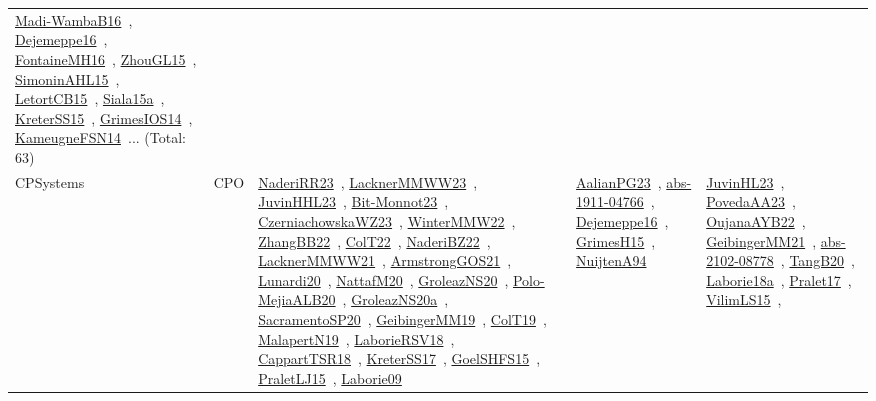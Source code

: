 {\begin{longtable}{lp{3cm}>{\raggedright\arraybackslash}p{6cm}>{\raggedright\arraybackslash}p{6cm}>{\raggedright\arraybackslash}p{8cm}}
\href{works/Madi-WambaB16.pdf}{Madi-WambaB16}~\cite{Madi-WambaB16}, \href{works/Dejemeppe16.pdf}{Dejemeppe16}~\cite{Dejemeppe16}, \href{works/FontaineMH16.pdf}{FontaineMH16}~\cite{FontaineMH16}, \href{works/ZhouGL15.pdf}{ZhouGL15}~\cite{ZhouGL15}, \href{works/SimoninAHL15.pdf}{SimoninAHL15}~\cite{SimoninAHL15}, \href{works/LetortCB15.pdf}{LetortCB15}~\cite{LetortCB15}, \href{works/Siala15a.pdf}{Siala15a}~\cite{Siala15a}, \href{works/KreterSS15.pdf}{KreterSS15}~\cite{KreterSS15}, \href{works/GrimesIOS14.pdf}{GrimesIOS14}~\cite{GrimesIOS14}, \href{works/KameugneFSN14.pdf}{KameugneFSN14}~\cite{KameugneFSN14}... (Total: 63)\\
CPSystems & CPO & \href{works/NaderiRR23.pdf}{NaderiRR23}~\cite{NaderiRR23}, \href{works/LacknerMMWW23.pdf}{LacknerMMWW23}~\cite{LacknerMMWW23}, \href{works/JuvinHHL23.pdf}{JuvinHHL23}~\cite{JuvinHHL23}, \href{works/Bit-Monnot23.pdf}{Bit-Monnot23}~\cite{Bit-Monnot23}, \href{works/CzerniachowskaWZ23.pdf}{CzerniachowskaWZ23}~\cite{CzerniachowskaWZ23}, \href{works/WinterMMW22.pdf}{WinterMMW22}~\cite{WinterMMW22}, \href{works/ZhangBB22.pdf}{ZhangBB22}~\cite{ZhangBB22}, \href{works/ColT22.pdf}{ColT22}~\cite{ColT22}, \href{works/NaderiBZ22.pdf}{NaderiBZ22}~\cite{NaderiBZ22}, \href{works/LacknerMMWW21.pdf}{LacknerMMWW21}~\cite{LacknerMMWW21}, \href{works/ArmstrongGOS21.pdf}{ArmstrongGOS21}~\cite{ArmstrongGOS21}, \href{works/Lunardi20.pdf}{Lunardi20}~\cite{Lunardi20}, \href{works/NattafM20.pdf}{NattafM20}~\cite{NattafM20}, \href{works/GroleazNS20.pdf}{GroleazNS20}~\cite{GroleazNS20}, \href{works/Polo-MejiaALB20.pdf}{Polo-MejiaALB20}~\cite{Polo-MejiaALB20}, \href{works/GroleazNS20a.pdf}{GroleazNS20a}~\cite{GroleazNS20a}, \href{works/SacramentoSP20.pdf}{SacramentoSP20}~\cite{SacramentoSP20}, \href{works/GeibingerMM19.pdf}{GeibingerMM19}~\cite{GeibingerMM19}, \href{works/ColT19.pdf}{ColT19}~\cite{ColT19}, \href{works/MalapertN19.pdf}{MalapertN19}~\cite{MalapertN19}, \href{works/LaborieRSV18.pdf}{LaborieRSV18}~\cite{LaborieRSV18}, \href{works/CappartTSR18.pdf}{CappartTSR18}~\cite{CappartTSR18}, \href{works/KreterSS17.pdf}{KreterSS17}~\cite{KreterSS17}, \href{works/GoelSHFS15.pdf}{GoelSHFS15}~\cite{GoelSHFS15}, \href{works/PraletLJ15.pdf}{PraletLJ15}~\cite{PraletLJ15}, \href{works/Laborie09.pdf}{Laborie09}~\cite{Laborie09} & \href{works/AalianPG23.pdf}{AalianPG23}~\cite{AalianPG23}, \href{works/abs-1911-04766.pdf}{abs-1911-04766}~\cite{abs-1911-04766}, \href{works/Dejemeppe16.pdf}{Dejemeppe16}~\cite{Dejemeppe16}, \href{works/GrimesH15.pdf}{GrimesH15}~\cite{GrimesH15}, \href{works/NuijtenA94.pdf}{NuijtenA94}~\cite{NuijtenA94} & \href{works/JuvinHL23.pdf}{JuvinHL23}~\cite{JuvinHL23}, \href{works/PovedaAA23.pdf}{PovedaAA23}~\cite{PovedaAA23}, \href{works/OujanaAYB22.pdf}{OujanaAYB22}~\cite{OujanaAYB22}, \href{works/GeibingerMM21.pdf}{GeibingerMM21}~\cite{GeibingerMM21}, \href{works/abs-2102-08778.pdf}{abs-2102-08778}~\cite{abs-2102-08778}, \href{works/TangB20.pdf}{TangB20}~\cite{TangB20}, \href{works/Laborie18a.pdf}{Laborie18a}~\cite{Laborie18a}, \href{works/Pralet17.pdf}{Pralet17}~\cite{Pralet17}, \href{works/VilimLS15.pdf}{VilimLS15}~\cite{VilimLS15}, 
\end{longtable}}
